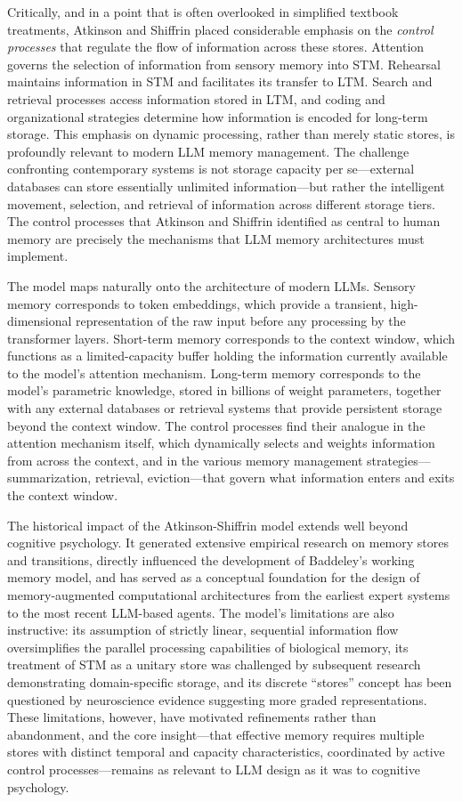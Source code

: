 \documentclass[11pt,letterpaper]{article}
\begin{document}
Critically, and in a point that is often overlooked in simplified textbook treatments, Atkinson and Shiffrin placed considerable emphasis on the \emph{control processes} that regulate the flow of information across these stores. Attention governs the selection of information from sensory memory into STM. Rehearsal maintains information in STM and facilitates its transfer to LTM. Search and retrieval processes access information stored in LTM, and coding and organizational strategies determine how information is encoded for long-term storage. This emphasis on dynamic processing, rather than merely static stores, is profoundly relevant to modern LLM memory management. The challenge confronting contemporary systems is not storage capacity per se---external databases can store essentially unlimited information---but rather the intelligent movement, selection, and retrieval of information across different storage tiers. The control processes that Atkinson and Shiffrin identified as central to human memory are precisely the mechanisms that LLM memory architectures must implement.

The model maps naturally onto the architecture of modern LLMs. Sensory memory corresponds to token embeddings, which provide a transient, high-dimensional representation of the raw input before any processing by the transformer layers. Short-term memory corresponds to the context window, which functions as a limited-capacity buffer holding the information currently available to the model's attention mechanism. Long-term memory corresponds to the model's parametric knowledge, stored in billions of weight parameters, together with any external databases or retrieval systems that provide persistent storage beyond the context window. The control processes find their analogue in the attention mechanism itself, which dynamically selects and weights information from across the context, and in the various memory management strategies---summarization, retrieval, eviction---that govern what information enters and exits the context window.

The historical impact of the Atkinson-Shiffrin model extends well beyond cognitive psychology. It generated extensive empirical research on memory stores and transitions, directly influenced the development of Baddeley's working memory model, and has served as a conceptual foundation for the design of memory-augmented computational architectures from the earliest expert systems to the most recent LLM-based agents. The model's limitations are also instructive: its assumption of strictly linear, sequential information flow oversimplifies the parallel processing capabilities of biological memory, its treatment of STM as a unitary store was challenged by subsequent research demonstrating domain-specific storage, and its discrete ``stores'' concept has been questioned by neuroscience evidence suggesting more graded representations. These limitations, however, have motivated refinements rather than abandonment, and the core insight---that effective memory requires multiple stores with distinct temporal and capacity characteristics, coordinated by active control processes---remains as relevant to LLM design as it was to cognitive psychology.
\end{document}
